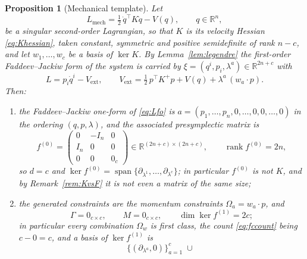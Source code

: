 \documentclass[12pt]{article}
\theoremstyle{plain}
\newtheorem{proposition}[theorem]{Proposition}
\theoremstyle{definition}
\theoremstyle{remark}
\newcommand{\R}{\mathbb{R}}
\DeclareMathOperator{\rank}{rank}
\DeclareMathOperator{\spn}{span}
\newcommand{\Om}{\Omega}
\begin{document}
	\begin{proposition}[Mechanical template]
		\label{prop:template}
		Let
		\begin{equation}
			L_{\mathrm{mech}}=\tfrac12\,\dot q^{\top}K\dot q-V(q),
			\qquad q\in\R^{n},
			\label{eq:Lmech}
		\end{equation}
		be a singular second-order Lagrangian, so that $K$ is its velocity Hessian
		\eqref{eq:Khessian}, taken constant, symmetric and positive semidefinite of rank
		$n-c$, and let $w_{1},\dots,w_{c}$ be a basis of $\ker K$. By
		Lemma~\ref{lem:legendre} the first-order Faddeev--Jackiw form of the system
		is carried by $\xi=(q^{i},p_{i},\lambda^{a})\in\R^{2n+c}$ with
		\begin{equation}
			L=p_{i}\dot q^{i}-V_{\mathrm{ext}},
			\qquad
			V_{\mathrm{ext}}=\tfrac12\,p^{\top}K^{+}p+V(q)+\lambda^{a}\,(w_{a}\!\cdot\!p).
			\label{eq:Lfo}
		\end{equation}
		Then:
		\begin{enumerate}[label=(\alph*),leftmargin=2.2em,itemsep=0.25em]
			\item the Faddeev--Jackiw one-form of \eqref{eq:Lfo} is
			$a=(p_{1},\dots,p_{n},0,\dots,0,0,\dots,0)$ in the ordering
			$(q,p,\lambda)$, and the associated presymplectic matrix is
			\begin{equation}
				f^{(0)}
				=\begin{pmatrix}0&-I_{n}&0\\ I_{n}&0&0\\ 0&0&0_{c}\end{pmatrix}
				\in\R^{(2n+c)\times(2n+c)},
				\qquad
				\rank f^{(0)}=2n,
				\label{eq:templatef0}
			\end{equation}
			so $d=c$ and
			$\ker f^{(0)}=\spn\{\partial_{\lambda^{1}},\dots,\partial_{\lambda^{c}}\}$;
			in particular $f^{(0)}$ is not $K$, and by Remark~\ref{rem:KvsF} it is
			not even a matrix of the same size;
			\item the generated constraints are the momentum constraints
			$\Om_{a}=w_{a}\!\cdot\!p$, and
			\begin{equation}
				\Gamma=0_{c\times c},
				\qquad
				M=0_{c\times c},
				\qquad
				\dim\ker f^{(1)}=2c ;
				\label{eq:templateGM}
			\end{equation}
			in particular every combination $\Om_{w}$ is first class, the count
			\eqref{eq:fccount} being $c-0=c$, and a basis of $\ker f^{(1)}$ is
			\begin{equation}
				\bigl\{(\partial_{\lambda^{a}},0)\bigr\}_{a=1}^{c}
				\;\cup\;

\end{equation}
\end{enumerate}
\end{proposition}
\end{document}
